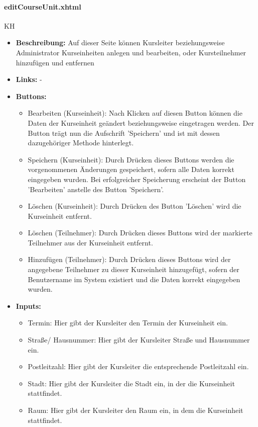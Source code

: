 				\paragraph{editCourseUnit.xhtml}
					KH\\
					\begin{itemize}
						\item \textbf{Beschreibung:} Auf dieser Seite können Kursleiter beziehungsweise Administrator Kurseinheiten anlegen und bearbeiten, oder Kursteilnehmer hinzufügen und entfernen
						\item \textbf{Links:} -
						\item \textbf{Buttons:}
							\begin{itemize}
								\item Bearbeiten (Kurseinheit): Nach Klicken auf diesen Button können die Daten der Kurseinheit geändert beziehungsweise eingetragen werden. Der Button trägt nun die Aufschrift 'Speichern' und ist mit dessen dazugehöriger Methode hinterlegt.
								\item Speichern (Kurseinheit): Durch Drücken dieses Buttons werden die vorgenommenen Änderungen gespeichert, sofern alle Daten korrekt eingegeben wurden. Bei erfolgreicher Speicherung erscheint der Button 'Bearbeiten' anstelle des Button 'Speichern'.
								\item Löschen (Kurseinheit): Durch Drücken des Button 'Löschen' wird die Kurseinheit entfernt.
								\item Löschen (Teilnehmer): Durch Drücken dieses Buttons wird der markierte Teilnehmer aus der Kurseinheit entfernt.
								\item Hinzufügen (Teilnehmer): Durch Drücken dieses Buttons wird der angegebene Teilnehmer zu dieser Kurseinheit hinzugefügt, sofern der Benutzername im System existiert und die Daten korrekt eingegeben wurden.
							\end{itemize}
						\item \textbf{Inputs:}
							\begin{itemize}
								\item Termin: Hier gibt der Kursleiter den Termin der Kurseinheit ein.
								\item Straße/ Hausnummer: Hier gibt der Kursleiter Straße und Hausnummer ein.
								\item Postleitzahl: Hier gibt der Kursleiter die entsprechende Postleitzahl ein.
								\item Stadt: Hier gibt der Kursleiter die Stadt ein, in der die Kurseinheit stattfindet.
								\item Raum: Hier gibt der Kursleiter den Raum ein, in dem die Kurseinheit stattfindet.

\end{itemize}
\end{itemize}
